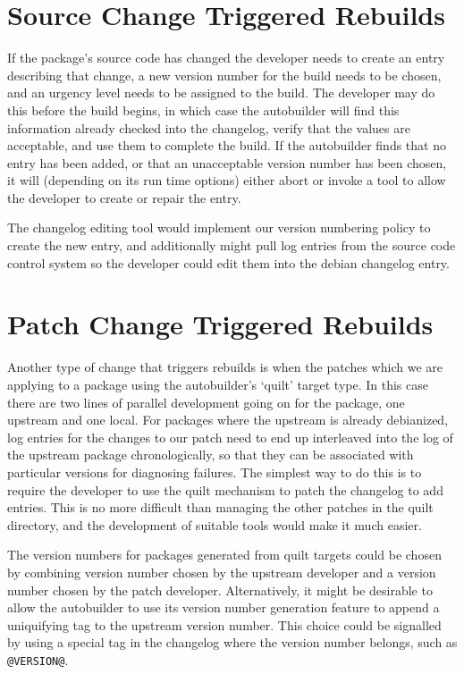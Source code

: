 \documentclass[12pt]{article}
\begin{document}
\section{Source Change Triggered Rebuilds}

If the package's source code has changed the developer needs to create
an entry describing that change, a new version number for the build
needs to be chosen, and an urgency level needs to be assigned to the
build.  The developer may do this before the build begins, in which
case the autobuilder will find this information already checked into
the changelog, verify that the values are acceptable, and use them to
complete the build.  If the autobuilder finds that no entry has been
added, or that an unacceptable version number has been chosen, it will
(depending on its run time options) either abort or invoke a tool to
allow the developer to create or repair the entry.

The changelog editing tool would implement our version numbering
policy to create the new entry, and additionally might pull log
entries from the source code control system so the developer could
edit them into the debian changelog entry.

\section{Patch Change Triggered Rebuilds}

Another type of change that triggers rebuilds is when the patches
which we are applying to a package using the autobuilder's `quilt'
target type.  In this case there are two lines of parallel development
going on for the package, one upstream and one local.  For packages
where the upstream is already debianized, log entries for the changes
to our patch need to end up interleaved into the log of the upstream
package chronologically, so that they can be associated with
particular versions for diagnosing failures.  The simplest way to do
this is to require the developer to use the quilt mechanism to patch
the changelog to add entries.  This is no more difficult than managing
the other patches in the quilt directory, and the development of
suitable tools would make it much easier.

The version numbers for packages generated from quilt targets could be
chosen by combining version number chosen by the upstream developer
and a version number chosen by the patch developer.  Alternatively, it
might be desirable to allow the autobuilder to use its version number
generation feature to append a uniquifying tag to the upstream version
number.  This choice could be signalled by using a special tag in the
changelog where the version number belongs, such as {\tt @VERSION@}.
\end{document}
